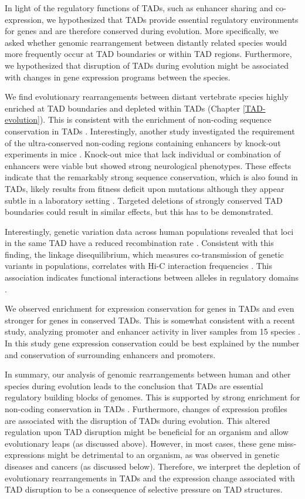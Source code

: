 \documentclass[a4paper,twoside=true,openright,parskip=full,chapterprefix=true,11pt,headings=normal,bibliography=totoc,listof=totoc,titlepage=on,captions=tableabove,draft=false]{scrreprt}
\theoremstyle{definition}
\theoremstyle{definition}
\theoremstyle{definition}
\theoremstyle{remark}
\begin{document}
In light of the regulatory functions of TADs, such as enhancer sharing
and co-expression, we hypothesized that TADs provide essential
regulatory environments for genes and are therefore conserved during
evolution. More specifically, we asked whether genomic rearrangement
between distantly related species would more frequently occur at TAD
boundaries or within TAD regions. Furthermore, we hypothesized that
disruption of TADs during evolution might be associated with changes in
gene expression programs between the species.

We find evolutionary rearrangements between distant vertebrate species
highly enriched at TAD boundaries and depleted within TADs (Chapter
\ref{TAD-evolution}). This is consistent with the enrichment of
non-coding sequence conservation in TADs
\citep{Harmston2017, Polychronopoulos2017}. Interestingly, another study
investigated the requirement of the ultra-conserved non-coding regions
containing enhancers by knock-out experiments in mice
\citep{Dickel2018}. Knock-out mice that lack individual or combination
of enhancers were viable but showed strong neurological phenotypes.
These effects indicate that the remarkably strong sequence conservation,
which is also found in TADs, likely results from fitness deficit upon
mutations although they appear subtle in a laboratory setting
\citep{Dickel2018}. Targeted deletions of strongly conserved TAD
boundaries could result in similar effects, but this has to be
demonstrated.

Interestingly, genetic variation data across human populations revealed
that loci in the same TAD have a reduced recombination rate
\citep{Liu2016b}. Consistent with this finding, the linkage
disequilibrium, which measures co-transmission of genetic variants in
populations, correlates with Hi-C interaction frequencies
\citep{Gerber2018}. This association indicates functional interactions
between alleles in regulatory domains \citep{Liu2016b}.

We observed enrichment for expression conservation for genes in TADs and
even stronger for genes in conserved TADs. This is somewhat consistent
with a recent study, analyzing promoter and enhancer activity in liver
samples from 15 species \citep{Berthelot2017}. In this study gene
expression conservation could be best explained by the number and
conservation of surrounding enhancers and promoters.

In summary, our analysis of genomic rearrangements between human and
other species during evolution leads to the conclusion that TADs are
essential regulatory building blocks of genomes. This is supported by
strong enrichment for non-coding conservation in TADs
\citep{Harmston2017}. Furthermore, changes of expression profiles are
associated with the disruption of TADs during evolution. This altered
regulation upon TAD disruption might be beneficial for an organism and
allow evolutionary leaps (as discussed above). However, in most cases,
these gene miss-expressions might be detrimental to an organism, as was
observed in genetic diseases and cancers (as discussed below).
Therefore, we interpret the depletion of evolutionary rearrangements in
TADs and the expression change associated with TAD disruption to be a
consequence of selective pressure on TAD structures.
\end{document}
